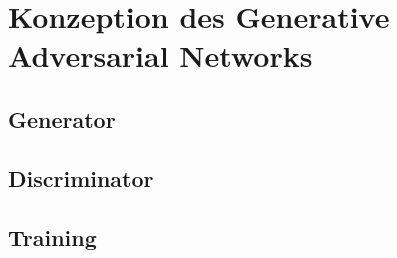 \chapter{Konzeption des Generative Adversarial Networks}
\section{Generator}
\section{Discriminator}
\section{Training}